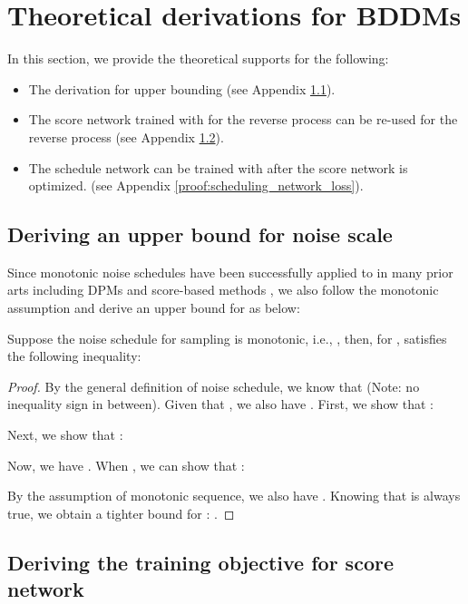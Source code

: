 \newpage
\appendix
\section{Theoretical derivations for BDDMs}
\label{appendix:A}

In this section, we provide the theoretical supports for the following:
\begin{itemize}
    \item The derivation for upper bounding  (see Appendix \ref{proof:upper_bound}).
    \item The score network  trained with  for the reverse process  can be re-used for the reverse process  (see Appendix \ref{proof:score_network_loss}).
    \item The schedule network  can be trained with  after the score network  is optimized. (see Appendix \ref{proof:scheduling_network_loss}).
\end{itemize}

\subsection{Deriving an upper bound for noise scale}
\label{proof:upper_bound}
Since monotonic noise schedules have been successfully applied to in many prior arts including DPMs \citep{ho2020denoising,kingma2021variational} and score-based methods \citep{yang2020, yang2020improved}, we also follow the monotonic assumption and derive an upper bound for  as below: 
\begin{customRemark}{1}
Suppose the noise schedule for sampling is monotonic, i.e., , then, for ,  satisfies the following inequality:

\end{customRemark}

\begin{proof}
By the general definition of noise schedule, we know that  (Note: no inequality sign in between).
Given that , we also have . First, we show that :

Next, we show that :

Now, we have .
When , we can show that :

By the assumption of monotonic sequence, we also have . Knowing that  is always true, we obtain a tighter bound for : .
\end{proof}

\subsection{Deriving the training objective for score network}
\label{proof:score_network_loss}

